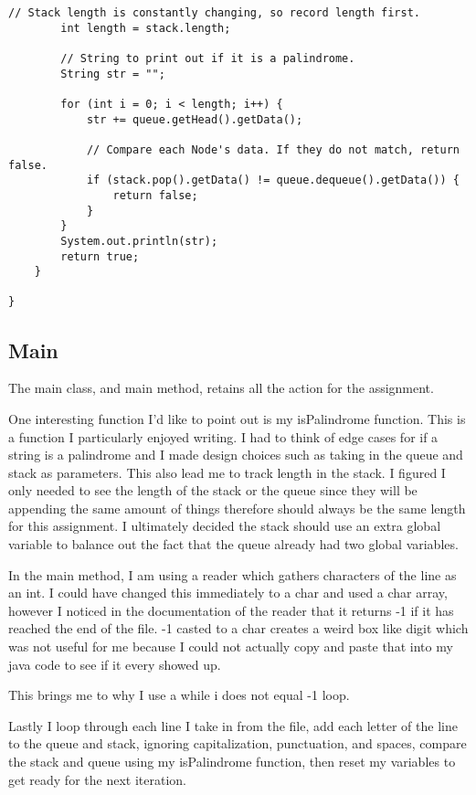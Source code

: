 \documentclass[letterpaper, 10pt,DIV=13]{scrartcl}
\numberwithin{equation}{section} %
\numberwithin{figure}{section} %
\numberwithin{table}{section} %
\begin{document}
\begin{lstlisting}[frame=single, ]
        // Stack length is constantly changing, so record length first.
        int length = stack.length;

        // String to print out if it is a palindrome.
        String str = "";

        for (int i = 0; i < length; i++) {
            str += queue.getHead().getData();

            // Compare each Node's data. If they do not match, return false.
            if (stack.pop().getData() != queue.dequeue().getData()) {
                return false;
            }
        }
        System.out.println(str);
        return true;
    }

}
\end{lstlisting}
\subsection{Main}

The main class, and main method, retains all the action for the assignment. 

One interesting function I'd like to point out is my isPalindrome function. This is a function I particularly enjoyed writing. I had to think of edge cases for if a string is a palindrome and I made design choices such as taking in the queue and stack as parameters. This also lead me to track length in the stack. I figured I only needed to see the length of the stack or the queue since they will be appending the same amount of things therefore should always be the same length for this assignment. I ultimately decided the stack should use an extra global variable to balance out the fact that the queue already had two global variables.

In the main method, I am using a reader which gathers characters of the line as an int. I could have changed this immediately to a char and used a char array, however I noticed in the documentation of the reader that it returns -1 if it has reached the end of the file. -1 casted to a char creates a weird box like digit which was not useful for me because I could not actually copy and paste that into my java code to see if it every showed up. 

This brings me to why I use a while i does not equal -1 loop.

Lastly I loop through each line I take in from the file, add each letter of the line to the queue and stack, ignoring capitalization, punctuation, and spaces, compare the stack and queue using my isPalindrome function, then reset my variables to get ready for the next iteration.
\end{document}
